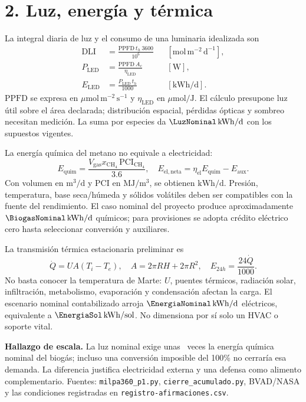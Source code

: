 \documentclass[11pt,a4paper]{article}
\begin{document}
\newpage
\section*{2. Luz, energía y térmica}
La integral diaria de luz y el consumo de una luminaria idealizada son
\begin{align}
 \mathrm{DLI}&=\frac{\mathrm{PPFD}\ t_h\ 3600}{10^6}
 &&[\mathrm{mol\,m^{-2}\,d^{-1}}],\\
 P_{\mathrm{LED}}&=\frac{\mathrm{PPFD}\ A_c}{\eta_{\mathrm{LED}}}
 &&[\mathrm W],\\
 E_{\mathrm{LED}}&=\frac{P_{\mathrm{LED}}\,t_h}{1000}
 &&[\mathrm{kWh/d}].
\end{align}
$\mathrm{PPFD}$ se expresa en $\mu\mathrm{mol\,m^{-2}\,s^{-1}}$ y
$\eta_{\mathrm{LED}}$ en $\mu\mathrm{mol/J}$. El cálculo presupone luz útil sobre el
área declarada; distribución espacial, pérdidas ópticas y sombreo necesitan medición.
La suma por especies da $\LuzNominal\,\mathrm{kWh/d}$ con los supuestos vigentes.

La energía química del metano no equivale a electricidad:
\begin{equation}
 E_{\mathrm{quim}}=\frac{V_{\mathrm{gas}}x_{\mathrm{CH_4}}\,\mathrm{PCI}_{\mathrm{CH_4}}}{3.6},
 \quad E_{\mathrm{el,neta}}=\eta_{\mathrm{el}}E_{\mathrm{quim}}-E_{\mathrm{aux}}.
\end{equation}
Con volumen en $\mathrm{m^3/d}$ y PCI en $\mathrm{MJ/m^3}$, se obtienen
$\mathrm{kWh/d}$. Presión, temperatura, base seca/húmeda y sólidos volátiles deben
ser compatibles con la fuente del rendimiento. El caso nominal del proyecto produce
aproximadamente $\BiogasNominal\,\mathrm{kWh/d}$ químicos; para provisiones se adopta crédito
eléctrico cero hasta seleccionar conversión y auxiliares.

La transmisión térmica estacionaria preliminar es
\begin{equation}
 \dot Q=UA(T_i-T_e),\quad A=2\pi RH+2\pi R^2,
 \quad E_{24h}=\frac{24\dot Q}{1000}.
\end{equation}
No basta conocer la temperatura de Marte: $U$, puentes térmicos, radiación solar,
infiltración, metabolismo, evaporación y condensación afectan la carga. El escenario
nominal contabilizado arroja $\EnergiaNominal\,\mathrm{kWh/d}$ eléctricos, equivalente
a $\EnergiaSol\,\mathrm{kWh/sol}$. No dimensiona por sí solo un HVAC o soporte vital.

\textbf{Hallazgo de escala.} La luz nominal exige unas \RelacionLuz\ veces la energía química
nominal del biogás; incluso una conversión imposible del 100\% no cerraría esa demanda.
La diferencia justifica electricidad externa y una defensa como alimento complementario.
Fuentes: \texttt{milpa360\_p1.py}, \texttt{cierre\_acumulado.py}, BVAD/NASA y las
condiciones registradas en \texttt{registro-afirmaciones.csv}.
\end{document}

